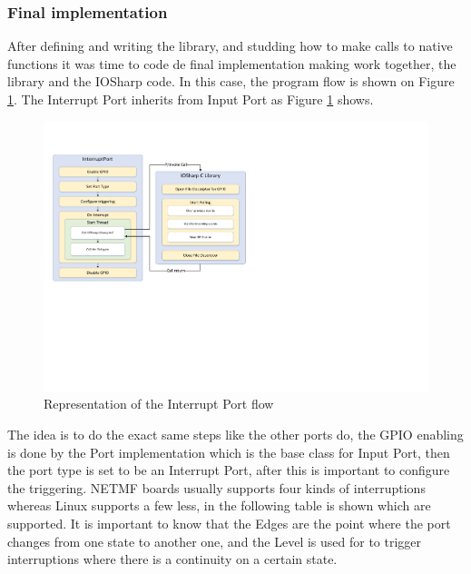 \subsubsection{Final implementation}\label{SSS:IOSharp-Interrupt-Implementation}
After defining and writing the library, and studding how to make calls to native functions it was time to code de final implementation making work together, the library and the IOSharp code. In this case, the program flow is shown on Figure \ref{fig:interrupt-schema}. The Interrupt Port inherits from Input Port as Figure \ref{fig:interrupt-schema} shows.

\begin{figure}[H]\begin{center}
 \centering
  \captionsetup{justification=centering}
  \includegraphics[width=1\textwidth]{pictures/iosharp/interrupt-schema}
  \caption{Representation of the Interrupt Port flow \label{fig:interrupt-schema}}
\end{center}\end{figure}

The idea is to do the exact same steps like the other ports do, the GPIO enabling is done by the Port implementation which is the base class for Input Port, then the port type is set to be an Interrupt Port, after this is important to configure the triggering. NETMF boards usually supports four kinds of interruptions whereas Linux supports a few less, in the following table is shown which are supported. It is important to know that the Edges are the point where the port changes from one state to another one, and the Level is used for to trigger interruptions where there is a continuity on a certain state.

